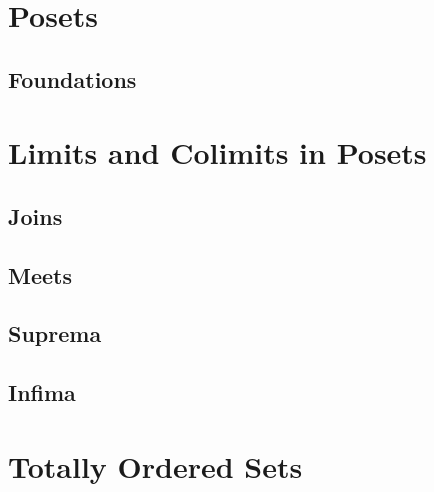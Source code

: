 \ChapterTableOfContents

\section{Posets}\label{section-posets}
\subsection{Foundations}\label{subsection-posets-foundations}
\section{Limits and Colimits in Posets}\label{section-limits-and-colimits-in-posets}
\subsection{Joins}\label{subsection-joins-in-posets}
\subsection{Meets}\label{subsection-meets-in-posets}
\subsection{Suprema}\label{subsection-suprema-in-posets}
\subsection{Infima}\label{subsection-infima-in-posets}
\section{Totally Ordered Sets}\label{section-totally-ordered-sets}
